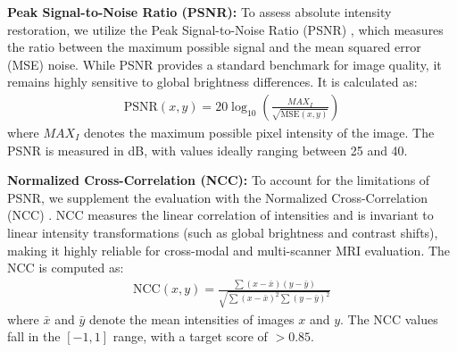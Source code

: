 \documentclass[11pt,a4paper]{article}
\begin{document}
\vspace{2mm}
\noindent
\textbf{Peak Signal-to-Noise Ratio (PSNR):} To assess absolute intensity restoration, we utilize the Peak Signal-to-Noise Ratio (PSNR) \cite{wang2009mean, huynh2008scope}, which measures the ratio between the maximum possible signal and the mean squared error (MSE) noise. While PSNR provides a standard benchmark for image quality, it remains highly sensitive to global brightness differences. It is calculated as:
\begin{align}
    \text{PSNR}(x, y) = 20 \log_{10} \left( \frac{MAX_I}{\sqrt{\text{MSE}(x,y)}} \right)
\end{align}
where $MAX_I$ denotes the maximum possible pixel intensity of the image. The PSNR is measured in dB, with values ideally ranging between 25 and 40.

\vspace{2mm}
\noindent
\textbf{Normalized Cross-Correlation (NCC):} To account for the limitations of PSNR, we supplement the evaluation with the Normalized Cross-Correlation (NCC) \cite{lewis1995fast, maintz1998survey}. NCC measures the linear correlation of intensities and is invariant to linear intensity transformations (such as global brightness and contrast shifts), making it highly reliable for cross-modal and multi-scanner MRI evaluation. The NCC is computed as:
\begin{align}
    \text{NCC}(x, y) = \frac{\sum (x - \bar{x})(y - \bar{y})}{\sqrt{\sum (x - \bar{x})^2 \sum (y - \bar{y})^2}}
\end{align}
where $\bar{x}$ and $\bar{y}$ denote the mean intensities of images $x$ and $y$. The NCC values fall in the $[-1, 1]$ range, with a target score of $> 0.85$.
\end{document}
